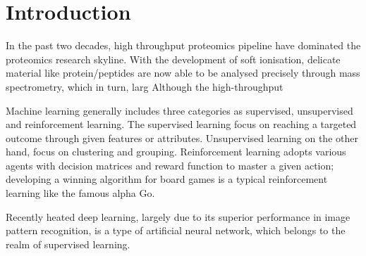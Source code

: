 \section{Introduction}

In the past two decades, high throughput proteomics pipeline have dominated the proteomics research skyline. With the development of soft ionisation, delicate material like protein/peptides are now able to be analysed precisely through mass spectrometry, which in turn, larg Although the high-throughput   
\par 
Machine learning generally includes three categories as supervised, unsupervised and reinforcement learning. The supervised learning focus on reaching a targeted outcome through given features or attributes. Unsupervised learning on the other hand, focus on clustering and grouping. Reinforcement learning adopts various agents with decision matrices and reward function to master a given action; developing a winning algorithm for board games is a typical reinforcement learning like the famous alpha Go.
\par
Recently heated deep learning, largely due to its superior performance in image pattern recognition, is a type of artificial neural network, which belongs to the realm of supervised learning. 
